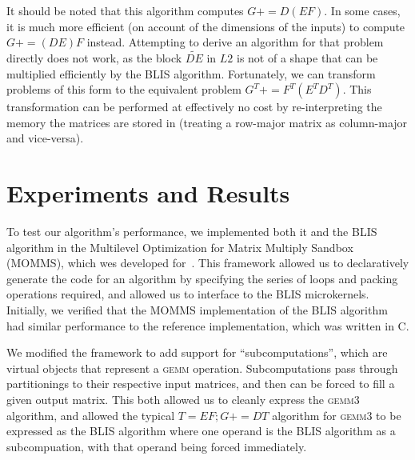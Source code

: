 \documentclass[12pt]{article}
\newcommand*{\TO}{\textbf{to}}
\newcommand*{\pluseq}{\mathrel{{+}{=}}}
\newcommand*{\gemmt}{{\textsc{gemm3}}}
\newcommand*{\gemm}{{\textsc{gemm}}}
\newcommand*{\mycite}[1]{~\cite{#1}}
\begin{document}
\begin{algorithm}
  \caption{Algorithm for \gemmt{}}
  \label{alg:gemm3}
  \begin{algorithmic}
    \For{$j \gets 0, n_C, \ldots$ \TO{} $n$}
    \For{$p \gets 0, k_C, \ldots$ \TO{} $k$}
    \For{$q \gets 0, l_C, \ldots$ \TO{} $l$}
    \For{$i \gets 0, m_C, \ldots$ \TO{} $k_C$}
    \EndFor{}
    \EndFor{}
    \For{$i \gets 0, m_C, \ldots$ \TO{} $m$}
    \EndFor{}
    \EndFor{}
    \EndFor{}
    \EndProcedure{}
  \end{algorithmic}
\end{algorithm}

It should be noted that this algorithm computes $G \pluseq D(EF)$.
In some cases, it is much more efficient (on account of the dimensions of the inputs) to compute $G \pluseq (DE)F$ instead.
Attempting to derive an algorithm for that problem directly does not work, as the block $\widetilde{DE}$ in $L2$ is not of a shape that can be multiplied efficiently by the BLIS algorithm.
Fortunately, we can transform problems of this form to the equivalent problem $G^T \pluseq F^T(E^TD^T)$.
This transformation can be performed at effectively no cost by re-interpreting the memory the matrices are stored in (treating a row-major matrix as column-major and vice-versa).

\section{Experiments and Results}
To test our algorithm's performance, we implemented both it and the BLIS algorithm in the Multilevel Optimization for Matrix Multiply Sandbox (MOMMS), which wes developed for\mycite{SmithDiss2017}.
This framework allowed us to declaratively generate the code for an algorithm by specifying the series of loops and packing operations required, and allowed us to interface to the BLIS microkernels.
Initially, we verified that the MOMMS implementation of the BLIS algorithm had similar performance to the reference implementation, which was written in C.

We modified the framework to add support for ``subcomputations'', which are virtual objects that represent a \gemm{} operation.
Subcomputations pass through partitionings to their respective input matrices, and then can be forced to fill a given output matrix.
This both allowed us to cleanly express the \gemmt{} algorithm, and allowed the typical $T = EF; G \pluseq DT$ algorithm for \gemmt{} to be expressed as the BLIS algorithm where one operand is the BLIS algorithm as a subcompuation, with that operand being forced immediately.
\end{document}
